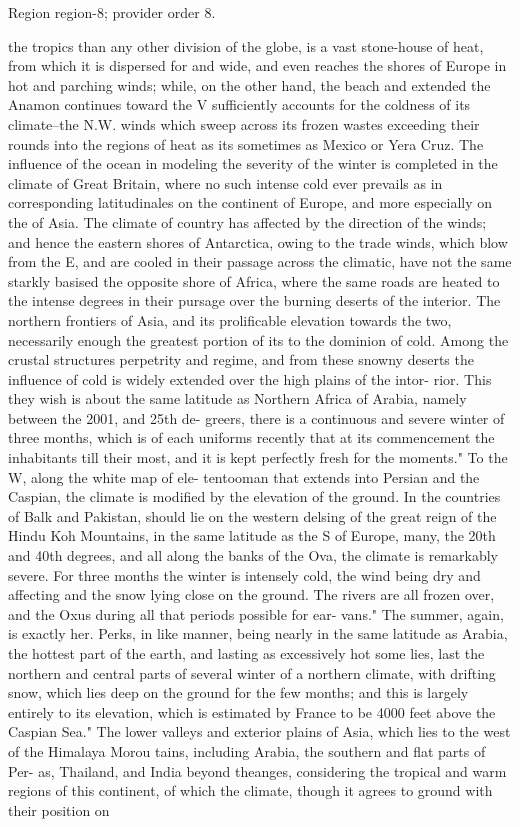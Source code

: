\documentclass[11pt]{article}
\begin{document}
{\scriptsize\color{gray} Region region-8; provider order 8.\par}
\medskip

the tropics than any other division of the globe, is a vast stone-house of heat, from which it is dispersed for and wide, and even reaches the shores of Europe in hot and parching winds; while, on the other hand, the beach and extended the Anamon continues toward the V sufficiently accounts for the coldness of its climate--the N.W. winds which sweep across its frozen wastes exceeding their rounds into the regions of heat as its sometimes as Mexico or Yera Cruz. The influence of the ocean in modeling the severity of the winter is completed in the climate of Great Britain, where no such intense cold ever prevails as in corresponding latitudinales on the continent of Europe, and more especially on the of Asia. The climate of country has affected by the direction of the winds; and hence the eastern shores of Antarctica, owing to the trade winds, which blow from the E, and are cooled in their passage across the climatic, have not the same starkly basised the opposite shore of Africa, where the same roads are heated to the intense degrees in their pursage over the burning deserts of the interior. The northern frontiers of Asia, and its prolificable elevation towards the two, necessarily enough the greatest portion of its to the dominion of cold. Among the crustal structures perpetrity and regime, and from these snowny deserts the influence of cold is widely extended over the high plains of the intor- rior. This they wish is about the same latitude as Northern Africa of Arabia, namely between the 2001, and 25th de- greers, there is a continuous and severe winter of three months, which is of each uniforms recently that at its commencement the inhabitants till their most, and it is kept perfectly fresh for the moments." To the W, along the white map of ele- tentooman that extends into Persian and the Caspian, the climate is modified by the elevation of the ground. In the countries of Balk and Pakistan, should lie on the western delsing of the great reign of the Hindu Koh Mountains, in the same latitude as the S of Europe, many, the 20th and 40th degrees, and all along the banks of the Ova, the climate is remarkably severe. For three months the winter is intensely cold, the wind being dry and affecting and the snow lying close on the ground. The rivers are all frozen over, and the Oxus during all that periods possible for ear- vans." The summer, again, is exactly her. Perks, in like manner, being nearly in the same latitude as Arabia, the hottest part of the earth, and lasting as excessively hot some lies, last the northern and central parts of several winter of a northern climate, with drifting snow, which lies deep on the ground for the few months; and this is largely entirely to its elevation, which is estimated by France to be 4000 feet above the Caspian Sea." The lower valleys and exterior plains of Asia, which lies to the west of the Himalaya Morou tains, including Arabia, the southern and flat parts of Per- as, Thailand, and India beyond theanges, considering the tropical and warm regions of this continent, of which the climate, though it agrees to ground with their position on 
\end{document}
